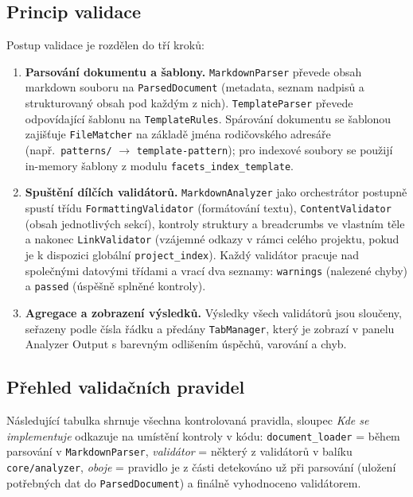 \documentclass[12pt, a4paper]{article}
\begin{document}
\subsection{Princip validace}

Postup validace je rozdělen do tří kroků:

\begin{enumerate}
    \item \textbf{Parsování dokumentu a šablony.} \texttt{MarkdownParser} převede obsah markdown souboru
    na \texttt{ParsedDocument} (metadata, seznam nadpisů a strukturovaný obsah pod každým z nich).
    \texttt{TemplateParser} převede odpovídající šablonu na \texttt{TemplateRules}.
    Spárování dokumentu se šablonou zajišťuje \texttt{FileMatcher} na základě jména rodičovského
    adresáře (např.\ \texttt{patterns/} $\rightarrow$ \texttt{template-pattern}); pro indexové soubory
    se použijí in-memory šablony z modulu \texttt{facets\_index\_template}.

    \item \textbf{Spuštění dílčích validátorů.} \texttt{MarkdownAnalyzer} jako orchestrátor postupně
    spustí třídu \texttt{FormattingValidator} (formátování textu), \texttt{ContentValidator}
    (obsah jednotlivých sekcí), kontroly struktury a breadcrumbs ve vlastním těle a nakonec
    \texttt{LinkValidator} (vzájemné odkazy v rámci celého projektu, pokud je k dispozici globální
    \texttt{project\_index}). Každý validátor pracuje nad společnými datovými třídami a vrací dva
    seznamy: \texttt{warnings} (nalezené chyby) a \texttt{passed} (úspěšně splněné kontroly).

    \item \textbf{Agregace a zobrazení výsledků.} Výsledky všech validátorů jsou sloučeny,
    seřazeny podle čísla řádku a předány \texttt{TabManager}, který je zobrazí v panelu
    Analyzer Output s barevným odlišením úspěchů, varování a chyb.
\end{enumerate}

\subsection{Přehled validačních pravidel}

Následující tabulka shrnuje všechna kontrolovaná pravidla, sloupec \emph{Kde se implementuje}
odkazuje na umístění kontroly v kódu: \texttt{document\_loader} = během parsování v
\texttt{MarkdownParser}, \emph{validátor} = některý z validátorů v balíku
\texttt{core/analyzer}, \emph{oboje} = pravidlo je z části detekováno už při parsování
(uložení potřebných dat do \texttt{ParsedDocument}) a finálně vyhodnoceno validátorem.
\end{document}
